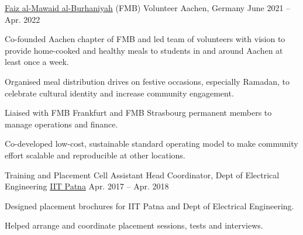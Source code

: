 
\begin{cvpositions}

\cvrole
	{\href{https://www.thedawoodibohras.com/about-the-bohras/faiz-al-mawaid-al-burhaniyah/}{Faiz al-Mawaid al-Burhaniyah} (FMB)} %
	{Volunteer} %
	{Aachen, Germany} %
	{June 2021 -- Apr. 2022} %
	{\begin{cvitems} %
		\item {Co-founded Aachen chapter of FMB and led team of volunteers with vision to provide home-cooked and healthy meals to students in and around Aachen at least once a week.}
		\item {Organised meal distribution drives on festive occasions, especially Ramadan, to celebrate cultural identity and increase community engagement.}
		\item {Liaised with FMB Frankfurt and FMB Strasbourg permanent members to manage operations and finance.}
		\item {Co-developed low-cost, sustainable standard operating model to make community effort scalable and reproducible at other locations.}
	\end{cvitems}}

\cvrole
	{Training and Placement Cell} %
	{Assistant Head Coordinator, Dept of Electrical Engineering} %
	{\href{https://www.iitp.ac.in}{IIT Patna}} %
	{Apr. 2017 -- Apr. 2018} %
	{\begin{cvitems} %
		\item {Designed placement brochures for IIT Patna and Dept of Electrical Engineering.}
		\item {Helped arrange and coordinate placement sessions, tests and interviews.}
	\end{cvitems}}


\end{cvpositions}
